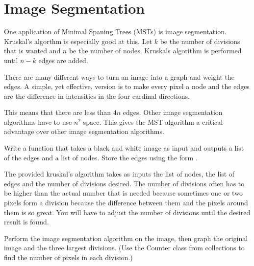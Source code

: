 \label{Ch:MSTImgSeg}


\section*{Image Segmentation}


One application of Minimal Spaning Trees (MSTs) is image segmentation.
Kruskal's algorthm is especially good at this.
Let $k$ be the number of divisions that is wanted and $n$ be the number of nodes.
Kruskals algorithm is performed until $n-k$ edges are added.

There are many different ways to turn an image into a graph and weight the edges.
A simple, yet effective, version is to make every pixel a node and the edges are the difference in intensities in the four cardinal directions. 

This means that there are less than $4n$ edges.
Other image segmentation algorithms have to use $n^2$ space.
This gives the MST algorithm a critical advantage over other image segmentation algorithms. 

\begin{problem}
Write a function that takes a black and white image as input and outputs a list of the edges and a list of nodes.
Store the edges using the form .
\end{problem}

The provided kruskal's algorithm takes as inputs the list of nodes, the list of edges and the number of divisions desired.
The number of divisions often has to be higher than the actual number that is needed because sometimes one or two pixels form a division because the difference between them and the pixels around them is so great.
You will have to adjust the number of divisions until the desired result is found.

\begin{problem}
Perform the image segmentation algorithm on the image, then graph the original image and the three largest divisions.
(Use the Counter class from collections to find the number of pixels in each division.) 
\end{problem}

